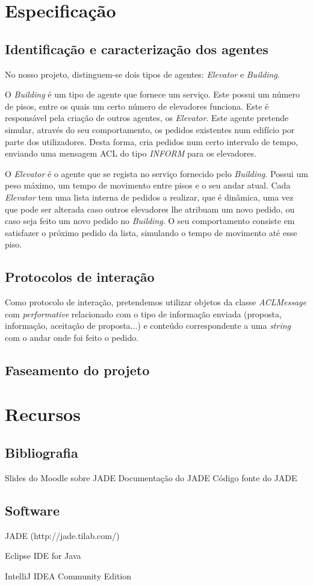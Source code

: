 \documentclass[a4paper]{article}
\begin{document}
\newpage

\section{Especificação}

\subsection{Identificação e caracterização dos agentes} 

No nosso projeto, distinguem-se dois tipos de agentes: \textit{Elevator} e \textit{Building}.

O \textit{Building} é um tipo de agente que fornece um serviço. Este possui um número de pisos, entre os quais um certo número de elevadores funciona. Este é responsável pela criação de outros agentes, os \textit{Elevator}. Este agente pretende simular, através do seu comportamento, os pedidos existentes num edifício por parte dos utilizadores. Desta forma, cria pedidos num certo intervalo de tempo, enviando uma mensagem ACL do tipo \textit{INFORM} para os elevadores.

O \textit{Elevator} é o agente que se regista no serviço fornecido pelo \textit{Building}. Possui um peso máximo, um tempo de movimento entre pisos e o seu andar atual. Cada \textit{Elevator} tem uma lista interna de pedidos a realizar, que é dinâmica, uma vez que pode ser alterada caso outros elevadores lhe atribuam um novo pedido, ou caso seja feito um novo pedido no \textit{Building}. O seu comportamento consiste em satisfazer o próximo pedido da lista, simulando o tempo de movimento até esse piso.

\subsection{Protocolos de interação} 

Como protocolo de interação, pretendemos utilizar objetos da classe \textit{ACLMessage} com \textit{performative} relacionado com o tipo de informação enviada (proposta, informação, aceitação de proposta...) e conteúdo correspondente a uma \textit{string} com o andar onde foi feito o pedido.

\subsection{Faseamento do projeto} 

\newpage

\section{Recursos}

\subsection{Bibliografia} 

Slides do Moodle sobre JADE
Documentação do JADE
Código fonte do JADE

\subsection{Software} 

JADE (http://jade.tilab.com/)

Eclipse IDE for Java

IntelliJ IDEA Community Edition
\end{document}
